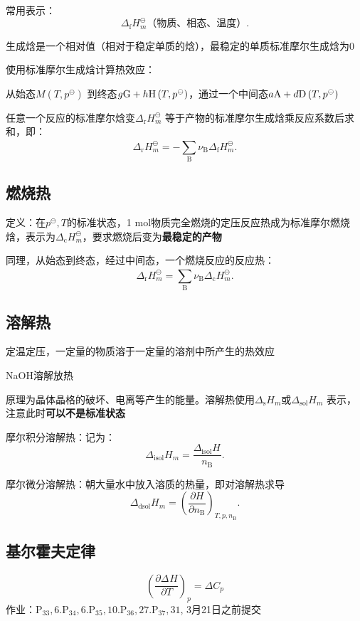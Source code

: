 常用表示：
\[
    \Delta_\text{f}H_{m}^\ominus \text{（物质、相态、温度）}
.\]
\begin{notation}
    生成焓是一个相对值（相对于稳定单质的焓），最稳定的单质标准摩尔生成焓为0
\end{notation}
使用标准摩尔生成焓计算热效应：
\begin{eg}
    从始态$M\left( T,p^\ominus \right)$ 到终态$g\ce{G}+h\ce{H}\left( T,p^\ominus \right)$，通过一个中间态$a\ce{A}+d \ce{D}\left( T,p^\ominus \right)$
\end{eg}
任意一个反应的标准摩尔焓变$\Delta_\text{r}H_{m}^\ominus $ 等于产物的标准摩尔生成焓乘反应系数后求和，即：\[
    \Delta_\text{r}H_{m}^\ominus = -\sum_\text{B}^{} \nu_\text{B}\Delta_\text{f}H_{m}^\ominus 
.\]
\subsection{燃烧热}%
\label{sub:燃烧热}
定义：在$p^\ominus,T$的标准状态，1 mol物质完全燃烧的定压反应热成为标准摩尔燃烧焓，表示为$\Delta_\text{c}H_{m}^\ominus $，要求燃烧后变为\textbf{最稳定的产物}

同理，从始态到终态，经过中间态，一个燃烧反应的反应热：\[
    \Delta_\text{r}H_{m}^\ominus = \sum_\text{B}^{} \nu_\text{B}\Delta_\text{c}H_{m}^\ominus 
.\]
\subsection{溶解热}%
\label{sub:溶解热}
定温定压，一定量的物质溶于一定量的溶剂中所产生的热效应
\begin{eg}
    NaOH溶解放热
\end{eg}
原理为晶体晶格的破坏、电离等产生的能量。溶解热使用$\Delta_\text{s}H_{m} $或$\Delta_\text{sol}H_{m} $ 表示，注意此时\textbf{可以不是标准状态}
\begin{defi}
摩尔积分溶解热：记为：\[
    \Delta_\text{isol}H_{m} = \frac{\Delta_\text{isol}H_{}}{n_\text{B}}
.\]

摩尔微分溶解热：朝大量水中放入溶质的热量，即对溶解热求导\[
    \Delta_\text{dsol}H_{m} = \left(\frac{\partial H}{\partial n_\text{B}}\right)_{T,p,n_\text{B}} 
.\]
\end{defi}
\subsection{基尔霍夫定律}%
\label{sub:基尔霍夫定律}
\begin{equation}
    \label{eq:基尔霍夫定律}
    \left(\frac{\partial \Delta_\text{}H }{\partial T}\right)_{p} = \Delta C_{p}
\end{equation}
作业：$\text{P}_{33},6. \text{P}_{34}, 6. \text{P}_{35}, 10. \text{P}_{36}, 27. \text{P}_{37}, 31$, 3月21日之前提交
